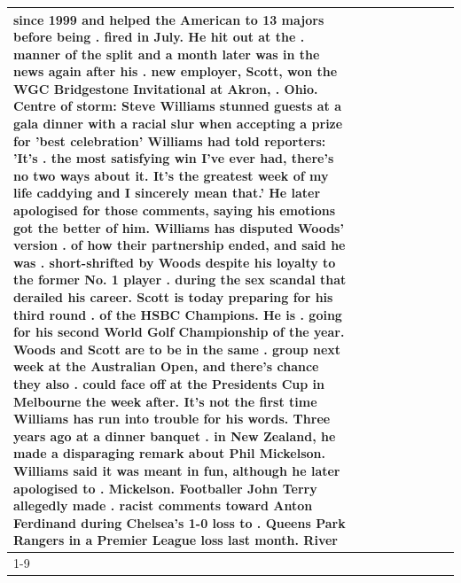 \begin{table}[H]
\begin{tabular}{lllrlllll}
since 1999 and helped the American to 13 majors before being . fired in July. He hit out at the . manner of the split and a month later was in the news again after his . new employer, Scott, won the WGC Bridgestone Invitational at Akron, . Ohio. Centre of storm: Steve Williams stunned guests at a gala dinner with a racial slur when accepting a prize for 'best celebration' Williams had told reporters: 'It's . the most satisfying win I've ever had, there's no two ways about it. It's the greatest week of my life caddying and I sincerely mean that.' He later apologised for those comments, saying his emotions got the better of him. Williams has disputed Woods' version . of how their partnership ended, and said he was . short-shrifted by Woods despite his loyalty to the former No. 1 player . during the sex scandal that derailed his career. Scott is today preparing for his third round . of the HSBC Champions. He is . going for his second World Golf Championship of the year. Woods and Scott are to be in the same . group next week at the Australian Open, and there's chance they also . could face off at the Presidents Cup in Melbourne the week after. It's not the first time Williams has run into trouble for his words. Three years ago at a dinner banquet . in New Zealand, he made a disparaging remark about Phil Mickelson. Williams said it was meant in fun, although he later apologised to . Mickelson. Footballer John Terry allegedly made . racist comments toward Anton Ferdinand during Chelsea's 1-0 loss to . Queens Park Rangers in a Premier League loss last month. River \\
\cline{1-9}

\end{tabular}
\end{table}
